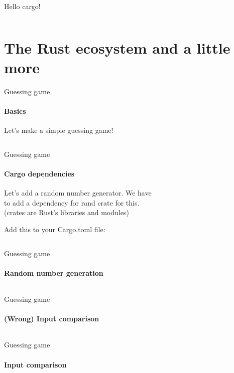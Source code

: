 \documentclass[usenames,dvipsnames,10pt,aspectratio=169]{beamer}
\begin{document}
\begin{frame}{Hello cargo!}

	\inputminted[fontsize=\Large]{bash}{code/hellocargo.sh}

\end{frame}


\section{The Rust ecosystem and a little more}

\begin{frame}{Guessing game}
	\framesubtitle{Basics}
\textcolor{ucuyellow}{Let's make a simple guessing game!}
	\vspace{0.4cm}
	\inputminted[fontsize=\normalsize]{c}{code/guess1.rs}
	\vspace{0.4cm}
\end{frame}

\begin{frame}{Guessing game}
	\framesubtitle{Cargo dependencies}
	\Large
	Let's add a random number generator. We have\\
	to add a dependency for \textcolor{ucuyellow}{rand} crate for this.\\
	(crates are Rust's libraries and modules)
	\vspace{0.5cm}

	Add this to your Cargo.toml file:
	\inputminted[fontsize=\Large]{c}{code/toml1.toml}
\end{frame}

\begin{frame}{Guessing game}
	\framesubtitle{Random number generation}
	\inputminted[fontsize=\footnotesize]{c}{code/guess2.rs}
\end{frame}

\begin{frame}{Guessing game}
	\framesubtitle{(Wrong) Input comparison}
	\inputminted[fontsize=\normalsize]{c}{code/guess3.rs}
\end{frame}

\begin{frame}{Guessing game}
	\framesubtitle{Input comparison}
	\inputminted[fontsize=\normalsize]{c}{code/guess4.rs}
\end{frame}
\end{document}
